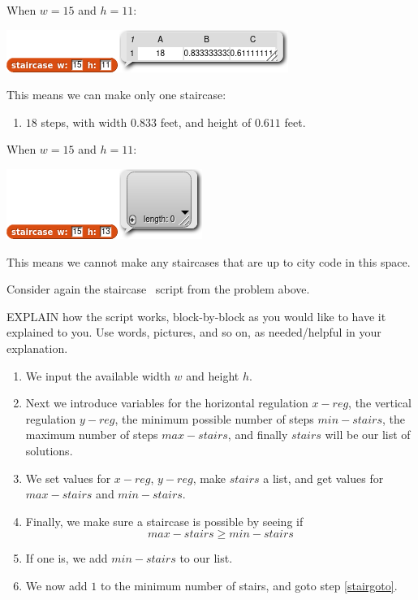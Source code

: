 \documentclass[noauthor,nooutcomes,handout]{../ximera}
\begin{document}
\begin{question}
\begin{freeResponse}
  When $w=15$ and $h=11$:
   \begin{center}
    \includegraphics{answer-15-11-script.png}
   \end{center}
   This means we can make only one staircase:
   \begin{enumerate}
   \item $18$ steps, with width $0.833$ feet, and height of $0.611$ feet.
   \end{enumerate}


   When $w=15$ and $h=11$:
   \begin{center}
    \includegraphics{answer-15-13-script.png}
  \end{center}
   This means we cannot make any staircases that are up to city code in this space.
\end{freeResponse}
\end{question}
\mynewpage

\begin{question}
  Consider again the staircase \snap\ script from the problem above.
  
  EXPLAIN how the script works, block-by-block as you would like to
  have it explained to you. Use words, pictures, and so on, as
  needed/helpful in your explanation.

  \begin{freeResponse}
    \begin{enumerate}
    \item We input the available width $w$ and height $h$.
    \item Next we introduce variables for the horizontal regulation
      $x-reg$, the vertical regulation $y-reg$, the minimum possible
      number of steps $min-stairs$, the maximum number of steps
      $max-stairs$, and finally $stairs$ will be our list of
      solutions.
    \item We set values for $x-reg$, $y-reg$, make $stairs$ a list,
      and get values for $max-stairs$ and $min-stairs$.
    \item\label{stairgoto} Finally, we make sure a staircase is possible by seeing if
      \[
      max-stairs \ge min-stairs
      \]
    \item If one is, we add $min-stairs$ to our list.
    \item We now add $1$ to the minimum number of stairs, and goto step \ref{stairgoto}.
    \end{enumerate}
  \end{freeResponse}
\end{question}
\mynewpage
\end{document}
